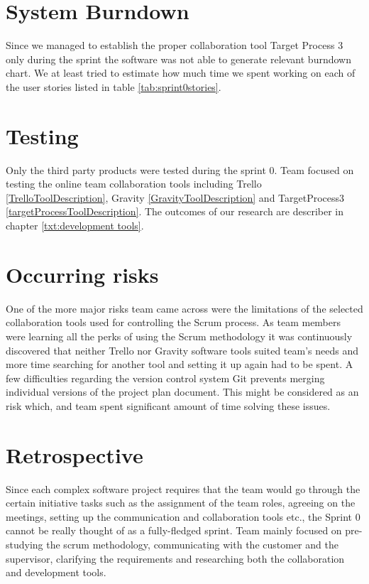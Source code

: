 \section{System Burndown}
Since we managed to establish the proper collaboration tool Target Process 3 only during the sprint the software was not able to generate relevant burndown chart.
We at least tried to estimate how much time we spent working on each of the user stories listed in table \ref{tab:sprint0stories}.

\section{Testing}

Only the third party products were tested during the sprint 0. Team focused on testing the online team collaboration tools including Trello \ref{TrelloToolDescription}, Gravity \ref{GravityToolDescription} and TargetProcess3 \ref{targetProcessToolDescription}. The outcomes of our research are describer in chapter \ref{txt:development tools}.

\section{Occurring risks}

One of the more major risks team came across were the limitations of the selected collaboration tools used for controlling the Scrum process. As team members were learning all the perks of using the Scrum methodology it was continuously discovered that neither Trello nor Gravity software tools suited team's needs and more time searching for another tool and setting it up again had to be spent. A few difficulties regarding the version control system Git prevents merging individual versions of the project plan document. This might be considered as an risk which, and team spent significant amount of time solving these issues.

\section{Retrospective}

Since each complex software project requires that the team would go through the certain initiative tasks such as the assignment of the team roles, agreeing on the meetings, setting up the communication and collaboration tools etc., the Sprint 0 cannot be really thought of as a fully-fledged sprint. Team mainly focused on pre-studying the scrum methodology, communicating with the customer and the supervisor, clarifying the requirements and researching both the collaboration and development tools.

